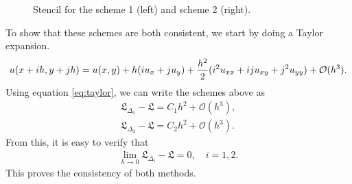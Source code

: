 \documentclass[10pt,a4paper,twoside, french]{article}
\numberwithin{equation}{section}
\numberwithin{figure}{section}
\numberwithin{table}{section}
\begin{document}
\begin{enumerate}
\begin{enumerate}[a.]
\begin{figure}[h]
\caption{Stencil for the scheme 1 (left) and scheme 2 (right).}
\end{figure}
To show that these schemes are both consistent, we start by doing a Taylor expansion.
\begin{align}
u(x+ih,y+jh) = u(x,y) +h(iu_x+ju_y)+\dfrac{h^2}{2}(i^2u_{xx}+iju_{xy}+j^2u_{yy})+{\cal{O}}(h^3).
\label{eq:taylor}
\end{align}
Using equation \eqref{eq:taylor}, we can write the schemes above as
\begin{align}
\mathfrak{L}_{\Delta_1}-\mathfrak{L} =  C_1h^2 + \mathcal{O}(h^3),\\
\mathfrak{L}_{\Delta_2}-\mathfrak{L} =  C_2h^2 + \mathcal{O}(h^3).
\end{align}
From this, it is easy to verify that 
\begin{align*}
\lim_{h\to0}\mathfrak{L}_{\Delta_i}-\mathfrak{L} = 0, \quad i=1,2.
\end{align*}
This proves the consistency of both methods.



\end{enumerate}
\end{enumerate}
\end{document}
